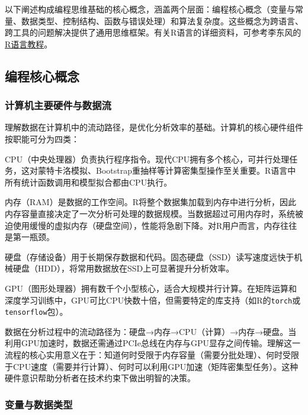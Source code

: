 \documentclass[
  twoside,12pt,fontset=none]{ctexbook}
\begin{document}
以下阐述构成编程思维基础的核心概念，涵盖两个层面：编程核心概念（变量与常量、数据类型、控制结构、函数与错误处理）和算法复杂度。这些概念为跨语言、跨工具的问题解决提供了通用思维框架。有关R语言的详细资料，可参考李东风的\href{https://www.math.pku.edu.cn/teachers/lidf/docs/Rbook/html/_Rbook/index.html}{R语言教程}。

\hypertarget{ux7f16ux7a0bux6838ux5fc3ux6982ux5ff5}{%
\subsection{编程核心概念}\label{ux7f16ux7a0bux6838ux5fc3ux6982ux5ff5}}

\hypertarget{ux8ba1ux7b97ux673aux4e3bux8981ux786cux4ef6ux4e0eux6570ux636eux6d41}{%
\subsubsection{计算机主要硬件与数据流}\label{ux8ba1ux7b97ux673aux4e3bux8981ux786cux4ef6ux4e0eux6570ux636eux6d41}}

理解数据在计算机中的流动路径，是优化分析效率的基础。计算机的核心硬件组件按职能可分为四类：

CPU（中央处理器）负责执行程序指令。现代CPU拥有多个核心，可并行处理任务，这对蒙特卡洛模拟、Bootstrap重抽样等计算密集型操作至关重要。R语言中所有统计函数调用和模型拟合都由CPU执行。

内存（RAM）是数据的工作空间。R将整个数据集加载到内存中进行分析，因此内存容量直接决定了一次分析可处理的数据规模。当数据超过可用内存时，系统被迫使用缓慢的虚拟内存（硬盘空间），性能将急剧下降。对R用户而言，内存往往是第一瓶颈。

硬盘（存储设备）用于长期保存数据和代码。固态硬盘（SSD）读写速度远快于机械硬盘（HDD），将常用数据放在SSD上可显著提升分析效率。

GPU（图形处理器）拥有数千个小型核心，适合大规模并行计算。在矩阵运算和深度学习训练中，GPU可比CPU快数十倍，但需要特定的库支持（如R的\texttt{torch}或\texttt{tensorflow}包）。

数据在分析过程中的流动路径为：硬盘→内存→CPU（计算）→内存→硬盘。当利用GPU加速时，数据还需通过PCIe总线在内存与GPU显存之间传输。理解这一流程的核心实用意义在于：知道何时受限于内存容量（需要分批处理）、何时受限于CPU速度（需要并行计算）、何时可以利用GPU加速（矩阵密集型任务）。这种硬件意识帮助分析者在技术约束下做出明智的决策。

\hypertarget{ux53d8ux91cfux4e0eux6570ux636eux7c7bux578b}{%
\subsubsection{变量与数据类型}\label{ux53d8ux91cfux4e0eux6570ux636eux7c7bux578b}}
\end{document}
